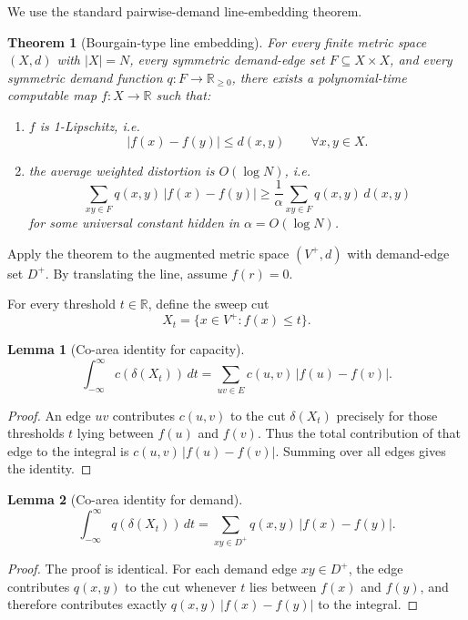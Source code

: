 \documentclass[11pt]{article}
\newtheorem{theorem}{Theorem}
\newtheorem{lemma}{Lemma}
\newcommand{\br}[1]{\left(#1\right)}
\newcommand{\cut}{\delta}
\begin{document}
We use the standard pairwise-demand line-embedding theorem.

\begin{theorem}[Bourgain-type line embedding]
For every finite metric space $(X,d)$ with $|X|=N$, every symmetric demand-edge set $F\subseteq X\times X$, and every symmetric demand function $q\colon F\to\mathbb{R}_{\ge 0}$, there exists a polynomial-time computable map $f\colon X\to\mathbb{R}$ such that:
\begin{enumerate}
\item $f$ is 1-Lipschitz, i.e.
\[
|f\br{x}-f\br{y}|\le d\br{x,y}\qquad \forall x,y\in X.
\]
\item the average weighted distortion is $O\br{\log N}$, i.e.
\[
\sum_{xy\in F} q\br{x,y}\,|f\br{x}-f\br{y}|
\ge
\frac{1}{\alpha}
\sum_{xy\in F} q\br{x,y}\,d\br{x,y}
\]
for some universal constant hidden in $\alpha=O\br{\log N}$.
\end{enumerate}
\end{theorem}

Apply the theorem to the augmented metric space $(V^+,d)$ with demand-edge set $D^+$. By translating the line, assume $f\br{r}=0$.

For every threshold $t\in\mathbb{R}$, define the sweep cut
\[
X_t=\{x\in V^+ : f\br{x}\le t\}.
\]

\begin{lemma}[Co-area identity for capacity]
\[
\int_{-\infty}^{\infty} c\br{\cut\br{X_t}}\,dt
=
\sum_{uv\in E} c\br{u,v}\,|f\br{u}-f\br{v}|.
\]
\end{lemma}

\begin{proof}
An edge $uv$ contributes $c\br{u,v}$ to the cut $\cut\br{X_t}$ precisely for those thresholds $t$ lying between $f\br{u}$ and $f\br{v}$. Thus the total contribution of that edge to the integral is $c\br{u,v}\,|f\br{u}-f\br{v}|$. Summing over all edges gives the identity.
\end{proof}

\begin{lemma}[Co-area identity for demand]
\[
\int_{-\infty}^{\infty} q\br{\cut\br{X_t}}\,dt
=
\sum_{xy\in D^+} q\br{x,y}\,|f\br{x}-f\br{y}|.
\]
\end{lemma}

\begin{proof}
The proof is identical. For each demand edge $xy\in D^+$, the edge contributes $q\br{x,y}$ to the cut whenever $t$ lies between $f\br{x}$ and $f\br{y}$, and therefore contributes exactly $q\br{x,y}\,|f\br{x}-f\br{y}|$ to the integral.
\end{proof}
\end{document}
